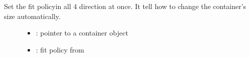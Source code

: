 \documentclass[letterpaper,10pt,english]{sphinxmanual}
\begin{document}
\begin{fulllineitems}
\label{\detokenize{object-types/cont:_CPPv415lv_cont_set_fitP8lv_obj_t8lv_fit_t}}%
\pysigstartmultiline
{}\label{\detokenize{object-types/cont:lv__cont_8h_1a976c863b553dcb01460c1ace1c57be21}}%
\pysigstopmultiline
Set the fit policyin all 4 direction at once. It tell how to change the container’s size automatically. \begin{description}
\item[{}] \leavevmode\begin{itemize}
\item {} 
: pointer to a container object 

\item {} 
: fit policy from  

\end{itemize}

\end{description}


\end{fulllineitems}

\end{document}
